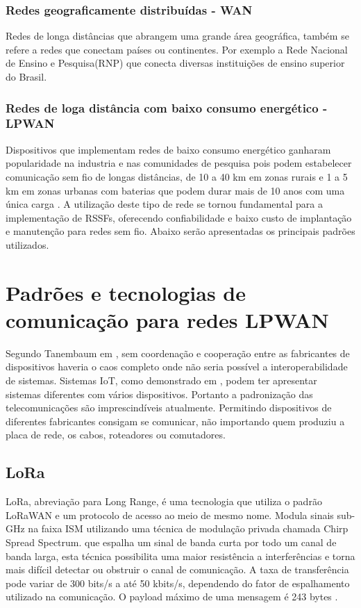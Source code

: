 \subsubsection{Redes geograficamente distribuídas - WAN}
Redes de longa distâncias que abrangem uma grande área geográfica, também se refere a redes que conectam países ou continentes. Por exemplo a Rede Nacional de Ensino e Pesquisa(RNP) que conecta diversas instituições de ensino superior do Brasil.

\subsubsection{Redes de loga distância com baixo consumo energético - LPWAN}
Dispositivos que implementam redes de baixo consumo energético ganharam popularidade na industria e nas comunidades de pesquisa pois podem estabelecer comunicação sem fio de longas distâncias, de 10 a 40 km em zonas rurais e 1 a 5 km em zonas urbanas com baterias que podem durar mais de 10 anos com uma única carga \cite{mekki2019comparative}. A utilização deste tipo de rede se tornou fundamental para a implementação de RSSFs, oferecendo confiabilidade e baixo custo de implantação e manutenção para redes sem fio. Abaixo serão apresentadas os principais padrões utilizados.


\section{Padrões e tecnologias de comunicação para redes LPWAN}
\label{padrõesSF}
Segundo Tanembaum em \cite{tanembaum2011}, sem coordenação e cooperação entre as fabricantes de dispositivos haveria o caos completo onde não seria possível a interoperabilidade de sistemas. Sistemas IoT, como demonstrado em \cite{sotres2017practical}, podem ter apresentar sistemas diferentes com vários dispositivos. Portanto a padronização das telecomunicações são imprescindíveis atualmente. Permitindo dispositivos de diferentes fabricantes consigam se comunicar, não importando quem produziu a placa de rede, os cabos, roteadores ou comutadores.

\subsection{LoRa}
LoRa, abreviação para Long Range, é uma tecnologia que utiliza o padrão LoRaWAN e um protocolo de acesso ao meio de mesmo nome. Modula sinais sub-GHz na faixa ISM utilizando uma técnica de modulação  privada chamada Chirp Spread Spectrum. que espalha um sinal de banda curta por todo um canal de banda larga, esta técnica possibilita uma maior resistência a interferências e torna mais difícil detectar ou obstruir o canal de comunicação. A taxa de transferência pode variar de 300 bits/s a até 50 kbits/s, dependendo do fator de espalhamento utilizado na comunicação. O payload máximo de uma mensagem é 243 bytes \cite{mekki2019comparative}.

